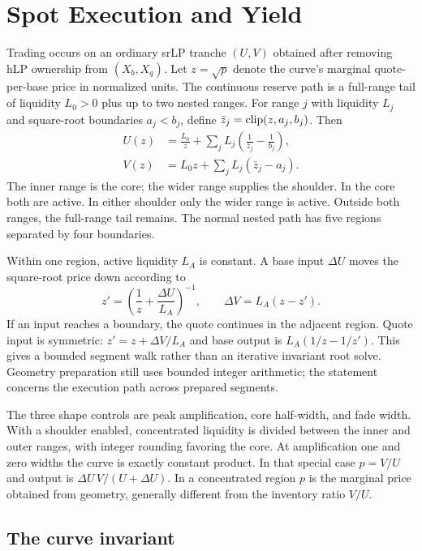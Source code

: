 \section{Spot Execution and Yield}
\label{sec:curve}

Trading occurs on an ordinary srLP tranche $(U,V)$ obtained after removing hLP ownership from $(X_b,X_q)$. Let $z=\sqrt p$ denote the curve's marginal quote-per-base price in normalized units. The continuous reserve path is a full-range tail of liquidity $L_0>0$ plus up to two nested ranges. For range $j$ with liquidity $L_j$ and square-root boundaries $a_j<b_j$, define $\bar z_j=\operatorname{clip}(z,a_j,b_j)$. Then
\begin{align}
U(z)&=\frac{L_0}{z}+\sum_j L_j\left(\frac{1}{\bar z_j}-\frac{1}{b_j}\right),\\
V(z)&=L_0z+\sum_j L_j(\bar z_j-a_j).
\label{eq:range}
\end{align}
The inner range is the core; the wider range supplies the shoulder. In the core both are active. In either shoulder only the wider range is active. Outside both ranges, the full-range tail remains. The normal nested path has five regions separated by four boundaries.

Within one region, active liquidity $L_A$ is constant. A base input $\Delta U$ moves the square-root price down according to
\begin{equation}
z'=\left(\frac1z+\frac{\Delta U}{L_A}\right)^{-1},\qquad
\Delta V=L_A(z-z').
\label{eq:segment}
\end{equation}
If an input reaches a boundary, the quote continues in the adjacent region. Quote input is symmetric: $z'=z+\Delta V/L_A$ and base output is $L_A(1/z-1/z')$. This gives a bounded segment walk rather than an iterative invariant root solve. Geometry preparation still uses bounded integer arithmetic; the statement concerns the execution path across prepared segments.

The three shape controls are peak amplification, core half-width, and fade width. With a shoulder enabled, concentrated liquidity is divided between the inner and outer ranges, with integer rounding favoring the core. At amplification one and zero widths the curve is exactly constant product. In that special case $p=V/U$ and output is $\Delta U\,V/(U+\Delta U)$. In a concentrated region $p$ is the marginal price obtained from geometry, generally different from the inventory ratio $V/U$.

\subsection{The curve invariant}

